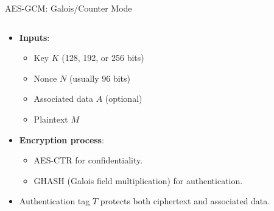 \documentclass[aspectratio=169, lualatex, handout]{beamer}
\begin{document}
\begin{frame}{AES-GCM: Galois/Counter Mode}
	\begin{columns}[c]
		\begin{column}{0.5\textwidth}
			\begin{itemize}[<+->]
				\item \textbf{Inputs}:
				      \begin{itemize}
					      \item Key $K$ (128, 192, or 256 bits)
					      \item Nonce $N$ (usually 96 bits)
					      \item Associated data $A$ (optional)
					      \item Plaintext $M$
				      \end{itemize}
				\item \textbf{Encryption process}:
				      \begin{itemize}
					      \item AES-CTR for confidentiality.
					      \item GHASH (Galois field multiplication) for authentication.
				      \end{itemize}
				\item Authentication tag $T$ protects both ciphertext and associated data.
			\end{itemize}
		\end{column}
		\begin{column}{0.5\textwidth}
		\end{column}
	\end{columns}
\end{frame}
\end{document}
